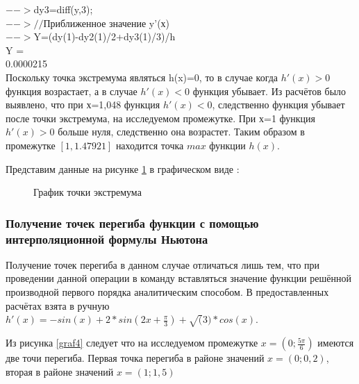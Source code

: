 \documentclass[russian,utf8,nocolumnxxxi,nocolumnxxxii]{eskdtext}
\begin{document}
$-->$dy3=diff(y,3);\\

$-->//$Приближенное значение y’(х)\\

$-->$Y=(dy(1)-dy2(1)/2+dy3(1)/3)/h\\
 Y  =\\

    0.0000215\\

Поскольку точка экстремума являться h(x)=0, то в случае когда $h'(x)>0$ функция возрастает, а в случае $h'(x)<0$ функция убывает. Из расчётов было выявлено, что при х=1,048 функция $h'(x)<0$, следственно функция убывает после точки экстремума, на исследуемом промежутке. При х=1 функция $h'(x)>0$ больше нуля, следственно она возрастет. Таким образом в промежутке $[1,1.47921]$ находится точка $max$ функции $h(x)$.


Представим данные на рисунке \ref{graf5} в графическом виде :
\vspace{0.5cm}
\begin{figure}[h]
\begin{center}
\vspace{1cm}
\caption{График точки экстремума}\label{graf5}
\end{center}
\end{figure}

\subsubsection{Получение точек перегиба функции с помощью интерполяционной формулы Ньютона}
Получение точек перегиба в данном случае отличаться лишь тем, что при проведении данной операции в команду вставляться значение функции решённой производной первого порядка аналитическим способом. В предоставленных расчётах взята в ручную $h'(x)=-sin(x)+2*sin(2x + \frac{\pi}{3}) + \sqrt(3)*cos(x)$.

Из рисунка \ref{graf4} следует что на исследуемом промежутке $x=(0;\frac{5\pi}{6})$ имеются две точи перегиба. Первая точка перегиба в районе значений $x=(0;0,2)$, вторая в районе значений $x=(1;1,5)$
\end{document}
